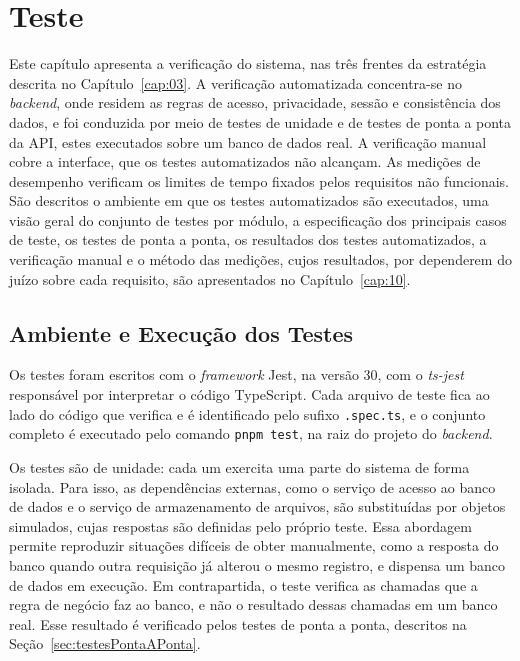 \chapter{Teste}
\label{cap:08}

Este capítulo apresenta a verificação do sistema, nas três frentes da estratégia descrita no Capítulo~\ref{cap:03}. A verificação automatizada concentra-se no \textit{backend}, onde residem as regras de acesso, privacidade, sessão e consistência dos dados, e foi conduzida por meio de testes de unidade e de testes de ponta a ponta da API, estes executados sobre um banco de dados real. A verificação manual cobre a interface, que os testes automatizados não alcançam. As medições de desempenho verificam os limites de tempo fixados pelos requisitos não funcionais. São descritos o ambiente em que os testes automatizados são executados, uma visão geral do conjunto de testes por módulo, a especificação dos principais casos de teste, os testes de ponta a ponta, os resultados dos testes automatizados, a verificação manual e o método das medições, cujos resultados, por dependerem do juízo sobre cada requisito, são apresentados no Capítulo~\ref{cap:10}.

\section{Ambiente e Execução dos Testes}

Os testes foram escritos com o \textit{framework} Jest, na versão 30, com o \textit{ts-jest} responsável por interpretar o código TypeScript. Cada arquivo de teste fica ao lado do código que verifica e é identificado pelo sufixo \texttt{.spec.ts}, e o conjunto completo é executado pelo comando \texttt{pnpm test}, na raiz do projeto do \textit{backend}.

Os testes são de unidade: cada um exercita uma parte do sistema de forma isolada. Para isso, as dependências externas, como o serviço de acesso ao banco de dados e o serviço de armazenamento de arquivos, são substituídas por objetos simulados, cujas respostas são definidas pelo próprio teste. Essa abordagem permite reproduzir situações difíceis de obter manualmente, como a resposta do banco quando outra requisição já alterou o mesmo registro, e dispensa um banco de dados em execução. Em contrapartida, o teste verifica as chamadas que a regra de negócio faz ao banco, e não o resultado dessas chamadas em um banco real. Esse resultado é verificado pelos testes de ponta a ponta, descritos na Seção~\ref{sec:testesPontaAPonta}.

